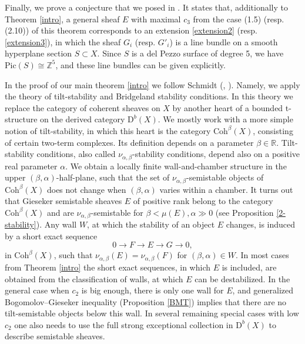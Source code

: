 \documentclass{amsart}
\begin{document}
	Finally, we prove a conjecture that we posed in \cite[Conjecture 4.5]{Vass}. It states that, additionally to Theorem \ref{intro}, a general sheaf $E$ with maximal $c_3$ from the case (1.5) (resp. (2.10)) of this theorem corresponds to an extension \ref{extension2} (resp. \ref{extension3}), in which the sheaf $G_i$ (resp. $G'_i$) is a line bundle on a smooth hyperplane section $S\subset X$. Since $S$ is a del Pezzo surface of degree 5, we have $\mathrm{Pic}(S)\cong\mathbb Z^5$, and these line bundles can be given explicitly.
	
	In the proof of our main theorem \ref{intro} we follow Schmidt (\cite{Sch18}, \cite{Sch23}). Namely, we apply the theory of tilt-stability and Bridgeland stability conditions. In this theory we replace the category of coherent sheaves on $X$ by another heart of a bounded t-structure on the derived category $\mathrm D^b(X)$. We mostly work with a more simple notion of tilt-stability, in which this heart is the category $\mathrm{Coh}^\beta(X)$, consisting of certain two-term complexes. Its definition depends on a parameter $\beta\in\mathbb R$. Tilt-stability conditions, also called $\nu_{\alpha,\beta}$-stability conditions, depend also on a positive real parameter $\alpha$. We obtain a locally finite wall-and-chamber structure in the upper $(\beta,\alpha)$-half-plane, such that the set of $\nu_{\alpha,\beta}$-semistable objects of $\mathrm{Coh}^\beta(X)$ does not change when $(\beta,\alpha)$ varies within a chamber. 
	It turns out that Gieseker semistable sheaves $E$ of positive rank belong to the category $\mathrm{Coh}^\beta(X)$ and are $\nu_{\alpha,\beta}$-semistable for $\beta<\mu(E),\alpha\gg 0$ (see Proposition \ref{2-stability}). Any wall $W$, at which the stability of an object $E$ changes, is induced by a short exact sequence
	$$0\to F\to E\to G\to 0,$$
	in $\mathrm{Coh}^\beta(X)$, such that $\nu_{\alpha,\beta}(E)=\nu_{\alpha,\beta}(F)$ for $(\beta,\alpha)\in W$. In most cases from Theorem \ref{intro} the short exact sequences, in which $E$ is included, are obtained from the classification of walls, at which $E$ can be destabilized. In the general case when $c_2$ is big enough, there is only one wall for $E$, and generalized Bogomolov--Gieseker inequality (Proposition \ref{BMT}) implies that there are no tilt-semistable objects below this wall. In several remaining special cases with low $c_2$ one also needs to use the full strong exceptional collection in $\mathrm D^b(X)$ to describe semistable sheaves.
	
\end{document}
